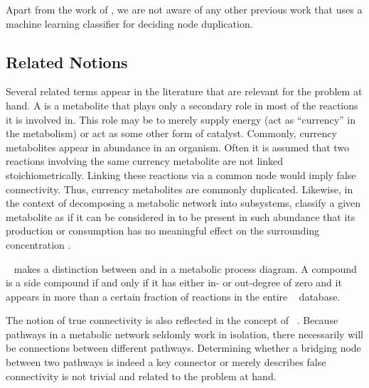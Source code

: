\documentclass[
	fontsize=10pt, %
	twoside=true, %
	secnumdepth=1, %
  toc=indentunnumbered %
]{kaobook}
\begin{document}
Apart from the work of \citeauthor{nielsen_MachineLearningSupport_2019}, we are
not aware of any other previous work that uses a machine learning
classifier for deciding node duplication.




\subsection{Related Notions} Several related terms appear in the literature that
are relevant for the problem at hand. A 
\cite{huss_CurrencyCommodityMetabolites_2007} is a metabolite that plays only a
secondary role in most of the reactions it is involved in. This role may be to
merely supply energy (act as ``currency'' in the metabolism) or act as some
other form of catalyst. Commonly, currency metabolites appear in abundance in an
organism. Often it is assumed that two reactions involving the same currency
metabolite are not linked stoichiometrically. Linking these reactions via a
common node would imply false connectivity. Thus, currency metabolites are
commonly duplicated.
Likewise, in the context of decomposing a metabolic network into subsystems,
\citeauthor{schuster_exploring_2002} classify a given metabolite as
 if it can be considered in to be present in such abundance that
its production or consumption has no meaningful effect on the surrounding
concentration
\cite{schuster_exploring_2002}.


\citeauthor{direks_DynamicVisualizationMetabolic_2014}~\cite{direks_DynamicVisualizationMetabolic_2014}
makes a distinction between  and  in a
metabolic process diagram. A compound is a side compound if and only if it has
either in- or out-degree of zero and it appears in more than a certain fraction
of reactions in the entire ~\cite{krieger_MetaCycMultiorganismDatabase_2004} database.


The notion of true connectivity is also reflected in the concept of ~\cite{kim_IdentificationCriticalConnectors_2019}. Because pathways
in a metabolic network seldomly work in isolation, there necessarily will be
connections between different pathways. Determining whether a bridging node
between two pathways is indeed a key connector or merely describes false
connectivity is not trivial and related to the problem at hand.
\end{document}
